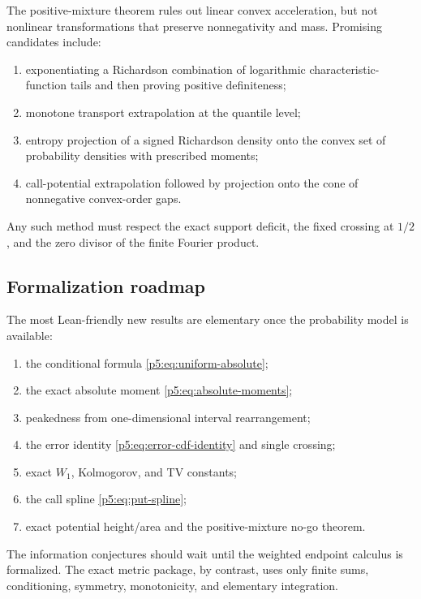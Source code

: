 \documentclass[11pt,oneside]{article}
\numberwithin{equation}{section}
\theoremstyle{definition}
\theoremstyle{remark}
\begin{document}
The positive-mixture theorem rules out linear convex acceleration, but not nonlinear transformations that preserve nonnegativity and mass.  Promising candidates include:

\begin{enumerate}
\item exponentiating a Richardson combination of logarithmic characteristic-function tails and then proving positive definiteness;
\item monotone transport extrapolation at the quantile level;
\item entropy projection of a signed Richardson density onto the convex set of probability densities with prescribed moments;
\item call-potential extrapolation followed by projection onto the cone of nonnegative convex-order gaps.
\end{enumerate}

Any such method must respect the exact support deficit, the fixed crossing at $1/2$, and the zero divisor of the finite Fourier product.

\subsection{Formalization roadmap}

The most Lean-friendly new results are elementary once the probability model is available:

\begin{enumerate}
\item the conditional formula \eqref{p5:eq:uniform-absolute};
\item the exact absolute moment \eqref{p5:eq:absolute-moments};
\item peakedness from one-dimensional interval rearrangement;
\item the error identity \eqref{p5:eq:error-cdf-identity} and single crossing;
\item exact $W_1$, Kolmogorov, and TV constants;
\item the call spline \eqref{p5:eq:put-spline};
\item exact potential height/area and the positive-mixture no-go theorem.
\end{enumerate}

The information conjectures should wait until the weighted endpoint calculus is formalized.  The exact metric package, by contrast, uses only finite sums, conditioning, symmetry, monotonicity, and elementary integration.
\end{document}

